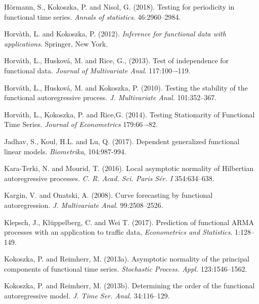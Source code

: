 \documentclass[11pt,a4paper]{article}
\begin{document}
\begin{thebibliography}{9}
H\"ormann, S., Kokoszka, P. and Nisol, G. (2018). Testing for periodicity in functional time series. \emph{Annals of statistics}. 46:2960--2984.

Horv\`ath, L. and Kokoszka, P. (2012). \emph{Inference for functional data with applications}. Springer, New York.

Horv\'ath, L., Huskov\'a, M. and  Rice, G., (2013). Test of independence for functional data. \emph{Journal of Multivariate Anal}. 117:100–-119.

Horv\'ath, L., Huskov\'a,  M.  and  Kokoszka, P. (2010).
	Testing the stability of the functional autoregressive process.
	\emph{J. Multivariate Anal.} 101:352--367.



Horv\'ath, L., Kokoszka, P. and Rice,G. (2014). Testing Stationarity of Functional Time Series. \emph{Journal of Econometrics} 179:66–-82.

Jadhav, S., Koul, H.L. and Lu, Q. (2017). Dependent generalized functional linear models. \emph{Biometrika}, 104:987-994.


 Kara-Terki, N. and Mourid, T.  (2016).
	Local asymptotic normality of {H}ilbertian autoregressive processes.
	\emph{C. R. Acad. Sci. Paris S\'er. I} 354:634--638.

Kargin, V. and Onatski,  A. (2008).
	Curve forecasting by functional autoregression.
	\emph{J. Multivariate Anal.} 99:2508--2526.

 Klepsch, J., Klüppelberg, C. and Wei T. (2017). Prediction of functional ARMA processes with an application to traffic data,
\emph{Econometrics and Statistics}. 1:128--149.

Kokoszka, P.  and Reimherr,  M. (2013a).
	Asymptotic normality of the principal components of functional time series.
	\emph{Stochastic Process. Appl.}
	123:1546--1562.
	
Kokoszka, P.  and Reimherr,  M. (2013b).
Determining the order of the functional autoregressive model.
	\emph{J. Time Ser. Anal.} 34:116--129.
	


\end{thebibliography}
\end{document}
